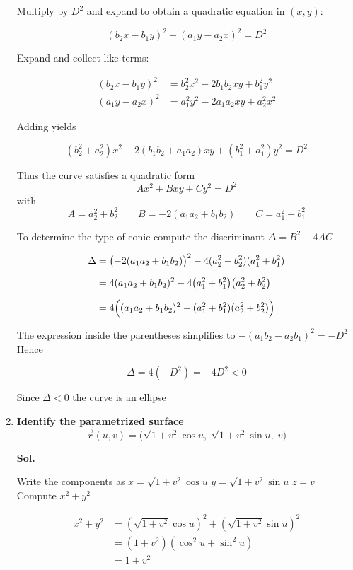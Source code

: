 \documentclass[14pt]{extarticle}
\begin{document}
\begin{enumerate}
Multiply by $D^2$ and expand to obtain a quadratic equation in $(x,y)$:

\[
(b_2 x - b_1 y)^2 + (a_1 y - a_2 x)^2 = D^2
\]

Expand and collect like terms:

\begin{align*}
(b_2 x - b_1 y)^2 &= b_2^2 x^2 - 2 b_1 b_2 x y + b_1^2 y^2\\
(a_1 y - a_2 x)^2 &= a_1^2 y^2 - 2 a_1 a_2 x y + a_2^2 x^2
\end{align*}

Adding yields

\[
(b_2^2 + a_2^2) x^2 - 2(b_1 b_2 + a_1 a_2) x y + (b_1^2 + a_1^2) y^2 = D^2
\]

Thus the curve satisfies a quadratic form
\[
A x^2 + B xy + C y^2 = D^2
\]
with
\[
A = a_2^2 + b_2^2\qquad B = -2(a_1 a_2 + b_1 b_2)\qquad C = a_1^2 + b_1^2
\]

To determine the type of conic compute the discriminant $\Delta = B^2 - 4AC$

\begin{align*}
\Delta &= \bigl(-2(a_1 a_2 + b_1 b_2)\bigr)^2 - 4(a_2^2 + b_2^2)(a_1^2 + b_1^2)\\[6pt]
&= 4(a_1 a_2 + b_1 b_2)^2 - 4\bigl(a_1^2 + b_1^2\bigr)\bigl(a_2^2 + b_2^2\bigr)\\[6pt]
&= 4\Bigl((a_1 a_2 + b_1 b_2)^2 - (a_1^2 + b_1^2)(a_2^2 + b_2^2)\Bigr)
\end{align*}

The expression inside the parentheses simplifies to $-(a_1 b_2 - a_2 b_1)^2 = -D^2$ Hence

\[
\Delta = 4(-D^2) = -4D^2 < 0
\]

Since $\Delta<0$ the curve is an ellipse

\newpage
\item \textbf{Identify the parametrized surface}
\[
\vec{r}(u,v) = \bigl(\sqrt{1+v^2}\cos u,\;\sqrt{1+v^2}\sin u,\; v\bigr)
\]

\textbf{Sol.}

Write the components as $x=\sqrt{1+v^2}\cos u$ $y=\sqrt{1+v^2}\sin u$ $z=v$ Compute $x^2+y^2$

\begin{align*}
x^2 + y^2 &= ( \sqrt{1+v^2}\cos u)^2 + ( \sqrt{1+v^2}\sin u)^2 \\
&= (1+v^2)(\cos^2 u + \sin^2 u) \\
&= 1+v^2
\end{align*}


\end{enumerate}
\end{document}
